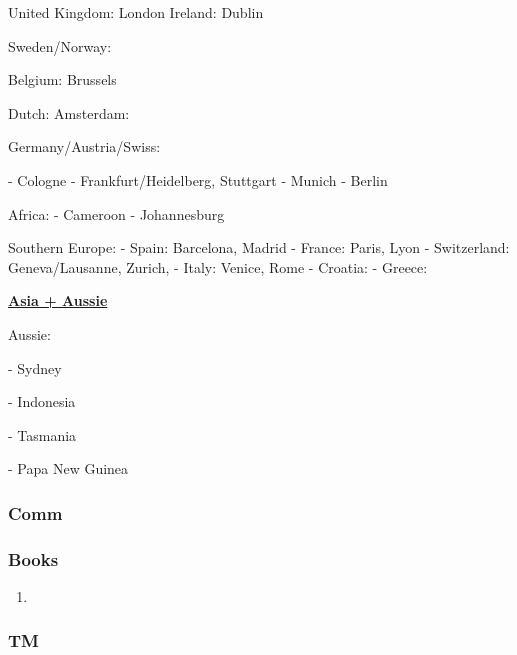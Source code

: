 \begin{frame}
United Kingdom: London 
Ireland: Dublin 

Sweden/Norway: 

Belgium: Brussels 

Dutch: Amsterdam: 

Germany/Austria/Swiss: 

- Cologne 
- Frankfurt/Heidelberg, Stuttgart
- Munich 
- Berlin 

Africa: 
- Cameroon
- Johannesburg

Southern Europe: 
   - Spain: Barcelona, Madrid
   - France: Paris, Lyon
   - Switzerland: Geneva/Lausanne, Zurich, 
   - Italy: Venice, Rome
   - Croatia: 
   - Greece: 
   
\underline{\textbf{Asia + Aussie }} 


Aussie: 

- Sydney

- Indonesia

- Tasmania

- Papa New Guinea



\end{frame}



\begin{frame}
\frametitle{Comm} 
\end{frame}

\begin{frame} 
\frametitle{Books} 
\begin{enumerate} 
\small \item \small 
\end{enumerate} 
\end{frame}

\begin{frame}
\frametitle{TM}
\end{frame}  

